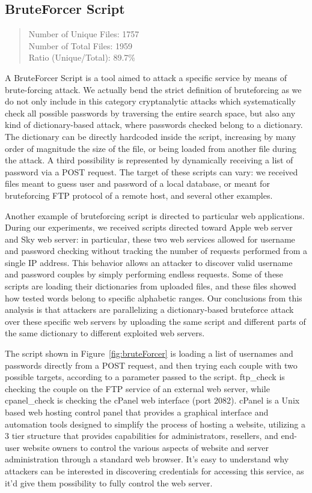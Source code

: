 \subsection{BruteForcer Script}

\begin{quote}
Number of Unique Files: 1757\\
Number of Total Files: 1959\\
Ratio (Unique/Total): 89.7\%
\end{quote}

A BruteForcer Script is a tool aimed to attack a specific service by means of brute-forcing attack. We actually bend the strict definition of bruteforcing as we do not only include in this category cryptanalytic attacks which systematically check all possible passwords by traversing the entire search space, but also any kind of dictionary-based attack, where passwords checked belong to a dictionary. The dictionary can be directly hardcoded inside the script, increasing by many order of magnitude the size of the file, or being loaded from another file during the attack. A third possibility is represented by dynamically receiving a list of password via a POST request. The target of these scripts can vary: we received files meant to guess user and password of a local database, or meant for bruteforcing FTP protocol of a remote host, and several other examples.

Another example of bruteforcing script is directed to particular web applications. During our experiments, we received scripts directed toward Apple web server and Sky web server: in particular, these two web services allowed for username and password checking without tracking the number of requests performed from a single IP address. This behavior allows an attacker to discover valid username and password couples by simply performing endless requests. Some of these scripts are loading their dictionaries from uploaded files, and these files showed how tested words belong to specific alphabetic ranges. Our conclusions from this analysis is that attackers are parallelizing a dictionary-based bruteforce attack over these specific web servers by uploading the same script and different parts of the same dictionary to different exploited web servers.

The script shown in Figure~\ref{fig:bruteForcer} is loading a list of usernames and passwords directly from a POST request, and then trying each couple with two possible targets, according to a parameter passed to the script. ftp\_check is checking the couple on the FTP service of an external web server, while cpanel\_check is checking the cPanel web interface (port 2082). cPanel is a Unix based web hosting control panel that provides a graphical interface and automation tools designed to simplify the process of hosting a website, utilizing a 3 tier structure that provides capabilities for administrators, resellers, and end-user website owners to control the various aspects of website and server administration through a standard web browser. It's easy to understand why attackers can be interested in discovering credentials for accessing this service, as it'd give them possibility to fully control the web server.

